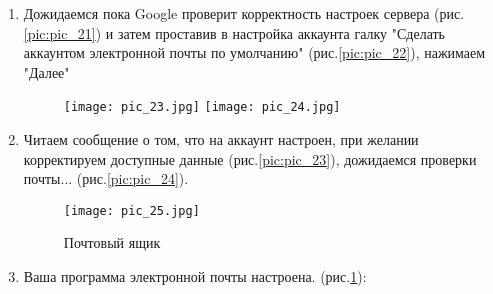 \begin{enumerate}[\thesection .1]
	\item Дожидаемся пока Google проверит корректность настроек сервера (рис.\ref{pic:pic_21}) и затем проставив в настройка аккаунта галку "Сделать аккаунтом электронной почты по умолчанию"  (рис.\ref{pic:pic_22}), нажимаем "Далее"
	
	
	\begin{figure}[!h]
		\begin{floatrow}
			{\texttt{[image: pic\_23.jpg]}}
			{\texttt{[image: pic\_24.jpg]}}         
		\end{floatrow}
	\end{figure}
	
	\item Читаем сообщение о том, что на аккаунт настроен, при желании корректируем доступные данные (рис.\ref{pic:pic_23}), дожидаемся проверки почты... (рис.\ref{pic:pic_24}).


\newpage
\begin{figure}[H]
	\texttt{[image: pic\_25.jpg]} 
	\caption{Почтовый ящик}\label{pic:pic_25}
\end{figure}
\item Ваша программа электронной почты настроена. (рис.\ref{pic:pic_25}):


\end{enumerate}